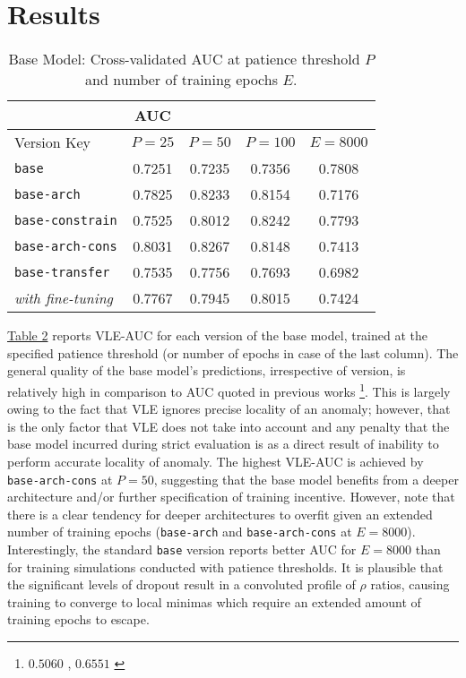 \documentclass[sigplan,authorversion,nonacm, 9pt]{acmart}
\begin{document}
\section{Results}

\begin{table}[h!]
\begin{tabular}{lcccc}
\multicolumn{1}{c|}{}                       & AUC  &      &       &       \\ \hline
\multicolumn{1}{l|}{Version Key}          & $P=25$ & $P=50$ & $P=100$ & $E=8000$ \\ \hline
\multicolumn{1}{l|}{\texttt{base}}  &    0.7251   &   0.7235      &   0.7356    &    0.7808   \\
\multicolumn{1}{l|}{\texttt{base-arch}}        &    0.7825   &   0.8233      &   0.8154    &    0.7176    \\
\multicolumn{1}{l|}{\texttt{base-constrain}}  &    0.7525   &   0.8012      &   0.8242    &    0.7793    \\
\multicolumn{1}{l|}{\texttt{base-arch-cons}}          &    0.8031  &   0.8267      &   0.8148     &   0.7413     \\
\multicolumn{1}{l|}{\texttt{base-transfer}}  &  0.7535    &  0.7756     &   0.7693    &  0.6982 \\
\multicolumn{1}{l|}{\textit{  with fine-tuning}} &   0.7767   &      0.7945 &   0.8015    &      0.7424 \\
\end{tabular}
\caption{Base Model: Cross-validated AUC at patience threshold $P$ and number of training epochs $E$.}
\label{tab:aucs}
\end{table}
\hyperref[tab:aucs]{Table 2} reports VLE-AUC for each version of the base model, trained at the specified patience threshold (or number of epochs in case of the last column). The general quality of the base model's predictions, irrespective of version, is relatively high in comparison to AUC quoted in previous works \footnote{$0.5060$ \cite{hassan}, $0.6551$ \cite{lu}}. This is largely owing to the fact that VLE ignores precise locality of an anomaly; however, that is the only factor that VLE does not take into account and any penalty that the base model incurred during strict evaluation is as a direct result of inability to perform accurate locality of anomaly. The highest VLE-AUC is achieved by \texttt{base-arch-cons} at $P=50$, suggesting that the base model benefits from a deeper architecture and/or further specification of training incentive. However, note that there is a clear tendency for deeper architectures to overfit given an extended number of training epochs (\texttt{base-arch} and \texttt{base-arch-cons} at $E=8000$). Interestingly, the standard \texttt{base} version reports better AUC for $E=8000$ than for training simulations conducted with patience thresholds. It is plausible that the significant levels of dropout result in a convoluted profile of $\rho$ ratios, causing training to converge to local minimas which require an extended amount of training epochs to escape.    
\end{document}
